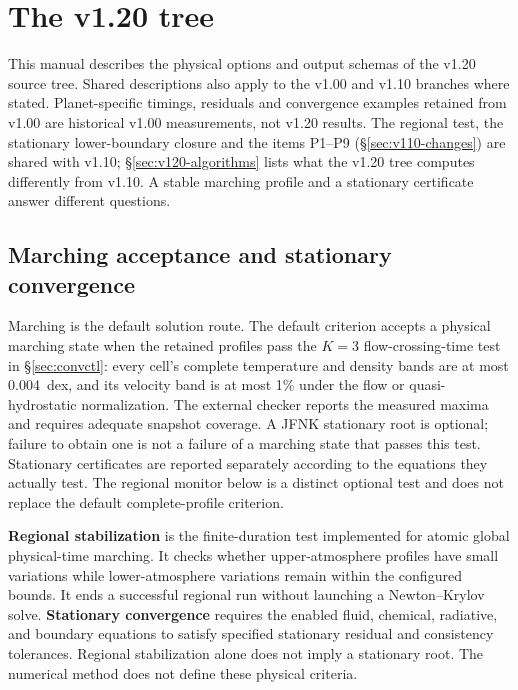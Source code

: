 \clearpage
\section{The v1.20 tree}\label{sec:v110-user}

This manual describes the physical options and output schemas of the v1.20
source tree. Shared descriptions also apply to the v1.00 and v1.10 branches
where stated. Planet-specific timings, residuals and convergence examples
retained from v1.00 are historical v1.00 measurements, not v1.20 results.
The regional test, the stationary lower-boundary closure and the items P1--P9
(\S\ref{sec:v110-changes}) are shared with v1.10;
\S\ref{sec:v120-algorithms} lists what the v1.20 tree computes differently
from v1.10. A stable marching profile and a stationary certificate answer
different questions.

\subsection{Marching acceptance and stationary convergence}

Marching is the default solution route. The default criterion accepts a physical marching state when the retained profiles pass the
$K=3$ flow-crossing-time test in \S\ref{sec:convctl}: every cell's complete
temperature and density bands are at most 0.004~dex, and its velocity band
is at most 1\% under the flow or quasi-hydrostatic normalization. The
external checker reports the measured maxima and requires adequate snapshot
coverage. A JFNK stationary root is optional; failure to obtain one is not
a failure of a marching state that passes this test. Stationary certificates
are reported separately according to the equations they actually test.
The regional monitor below is a distinct optional test and does not replace
the default complete-profile criterion.

\textbf{Regional stabilization} is the finite-duration test implemented for
atomic global physical-time marching. It checks whether upper-atmosphere
profiles have small variations while lower-atmosphere variations remain within
the configured bounds. It ends a successful regional run without launching a
Newton--Krylov solve. \textbf{Stationary convergence} requires the enabled
fluid, chemical, radiative, and boundary equations to satisfy specified
stationary residual and consistency tolerances. Regional stabilization alone
does not imply a stationary root. The numerical method does not define these
physical criteria.

